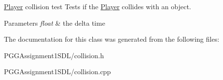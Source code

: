 \hyperlink{class_player}{Player} collision test Tests if the \hyperlink{class_player}{Player} collides with an object. 
\begin{DoxyParams}{Parameters}
{\em float} & the delta time \\
\hline
\end{DoxyParams}


The documentation for this class was generated from the following files\+:\begin{DoxyCompactItemize}
\item 
P\+G\+G\+Assignment1\+S\+D\+L/collision.\+h\item 
P\+G\+G\+Assignment1\+S\+D\+L/collision.\+cpp\end{DoxyCompactItemize}
